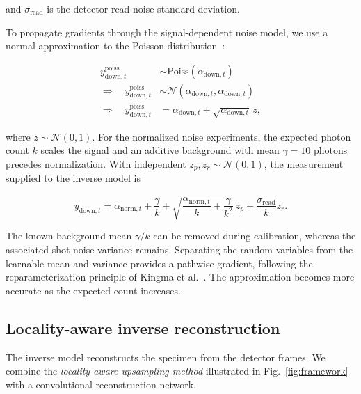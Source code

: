 \documentclass{optica-article}
\begin{document}
and $\sigma_{\mathrm{read}}$ is the detector read-noise standard deviation.

To propagate gradients through the signal-dependent noise model, we use a normal approximation to the Poisson distribution~\cite{cheng1949normal}:

\begin{equation}
\begin{aligned}
    y^{\mathrm{poiss}}_{\mathrm{down},t} &\sim \mathrm{Poiss}(\alpha_{\mathrm{down},t}) \\
    \Rightarrow \quad y^{\mathrm{poiss}}_{\mathrm{down},t} &\sim \mathcal{N}\left(\alpha_{\mathrm{down},t}, \alpha_{\mathrm{down},t}\right) \\
    \Rightarrow \quad y^{\mathrm{poiss}}_{\mathrm{down},t} &= \alpha_{\mathrm{down},t} + \sqrt{\alpha_{\mathrm{down},t}}\,z,
\end{aligned}
\label{eq:poisson-normal-approximation}
\end{equation}

where $z\sim\mathcal{N}(0,1)$. For the normalized noise experiments, the expected photon count $k$ scales the signal and an additive background with mean $\gamma=10$ photons precedes normalization. With independent $z_p,z_r\sim\mathcal{N}(0,1)$, the measurement supplied to the inverse model is

\begin{equation}
    y_{\mathrm{down},t}
    = \alpha_{\mathrm{norm},t} + \frac{\gamma}{k}
    + \sqrt{\frac{\alpha_{\mathrm{norm},t}}{k}+\frac{\gamma}{k^2}}\,z_p
    + \frac{\sigma_{\mathrm{read}}}{k}z_r.
    \label{eq:normalized-noise}
\end{equation}

The known background mean $\gamma/k$ can be removed during calibration, whereas the associated shot-noise variance remains. Separating the random variables from the learnable mean and variance provides a pathwise gradient, following the reparameterization principle of Kingma et al.~\cite{kingma2013auto}. The approximation becomes more accurate as the expected count increases.

\subsection{Locality-aware inverse reconstruction}
\label{sec:inverse-model}

The inverse model reconstructs the specimen from the detector frames. We combine the \textit{locality-aware upsampling method} illustrated in Fig.~\ref{fig:framework} with a convolutional reconstruction network.
\end{document}
